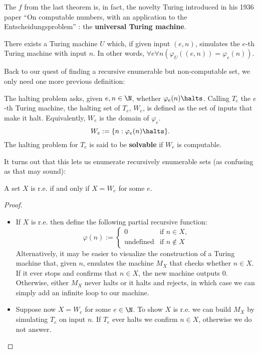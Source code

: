 \documentclass[../main.tex]{memoir}
\begin{document}
The $f$ from the last theorem is, in fact, the novelty Turing introduced in his 1936 paper ``On computable numbers, with an application to the Entscheidungsproblem'' \cite{oncomputablenumbers}: the \textbf{universal Turing machine}.

\begin{theorem}
  There exists a Turing machine $U$ which, if given input $(e, n)$, simulates the $e$-th Turing machine with input $n$. In other words, $\forall e \forall n (\varphi_U((e, n)) = \varphi_e(n))$.
\end{theorem}

Back to our quest of finding a recursive enumerable but non-computable set, we only need one more previous definition:

\begin{definition}
  The halting problem asks, given $e, n \in \N$, whether $\varphi_e(n) \halts$. Calling $T_e$ the $e$-th Turing machine, the halting set of $T_e$, $W_e$, is defined as the set of inputs that make it halt. Equivalently, $W_e$ is the domain of $\varphi_e$.
  \[ W_e := \{n : \varphi_e(n) \halts\}. \]
  The halting problem for $T_e$ is said to be \textbf{solvable} if $W_e$ is computable.
\end{definition}

It turns out that this lets us enumerate recursively enumerable sets (as confusing as that may sound):

\begin{theorem}
  A set $X$ is r.e. if and only if $X = W_e$ for some $e$.
\end{theorem}
\begin{proof}
  \begin{itemize}
  \item If $X$ is r.e. then define the following partial recursive function:
    \begin{equation*}
      \varphi(n) := \left\{
        \begin{array}{lr}
          0 & \text{if } n \in X \text{,} \\
          \text{undefined} & \text{if } n \not\in X
        \end{array}\right.
    \end{equation*}
    Alternatively, it may be easier to visualize the construction of a Turing machine that, given $n$, emulates the machine $M_X$ that checks whether $n \in X$. If it ever stops and confirms that $n \in X$, the new machine outputs $0$. Otherwise, either $M_X$ never halts or it halts and rejects, in which case we can simply add an infinite loop to our machine.
  \item Suppose now $X = W_e$ for some $e \in \N$. To show $X$ is r.e. we can build $M_X$ by simulating $T_e$ on input $n$. If $T_e$ ever halts we confirm $n \in X$, otherwise we do not answer.
  \end{itemize}
\end{proof}
\end{document}
